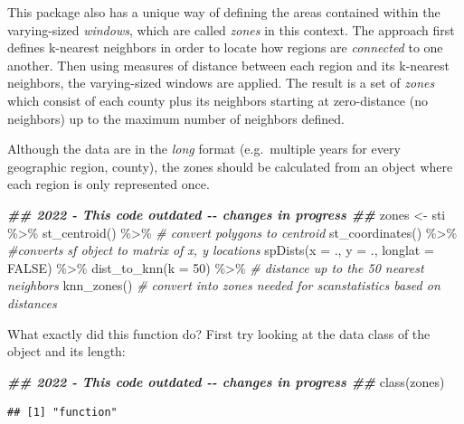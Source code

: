 \documentclass[
]{book}
\newenvironment{Shaded}{\begin{snugshade}}{\end{snugshade}}
\newcommand{\AttributeTok}[1]{\textcolor[rgb]{0.77,0.63,0.00}{#1}}
\newcommand{\CommentTok}[1]{\textcolor[rgb]{0.56,0.35,0.01}{\textit{#1}}}
\newcommand{\ConstantTok}[1]{\textcolor[rgb]{0.00,0.00,0.00}{#1}}
\newcommand{\DecValTok}[1]{\textcolor[rgb]{0.00,0.00,0.81}{#1}}
\newcommand{\DocumentationTok}[1]{\textcolor[rgb]{0.56,0.35,0.01}{\textbf{\textit{#1}}}}
\newcommand{\FunctionTok}[1]{\textcolor[rgb]{0.00,0.00,0.00}{#1}}
\newcommand{\NormalTok}[1]{#1}
\newcommand{\OtherTok}[1]{\textcolor[rgb]{0.56,0.35,0.01}{#1}}
\newcommand{\SpecialCharTok}[1]{\textcolor[rgb]{0.00,0.00,0.00}{#1}}
\begin{document}
This package also has a unique way of defining the areas contained within the varying-sized \emph{windows}, which are called \emph{zones} in this context. The approach first defines k-nearest neighbors in order to locate how regions are \emph{connected} to one another. Then using measures of distance between each region and its k-nearest neighbors, the varying-sized windows are applied. The result is a set of \emph{zones} which consist of each county plus its neighbors starting at zero-distance (no neighbors) up to the maximum number of neighbors defined.

Although the data are in the \emph{long} format (e.g.~multiple years for every geographic region, county), the zones should be calculated from an object where each region is only represented once.

\begin{Shaded}
\begin{Highlighting}[]
\DocumentationTok{\#\# 2022 {-} This code outdated {-}{-} changes in progress \#\#}
\NormalTok{zones }\OtherTok{\textless{}{-}}\NormalTok{ sti }\SpecialCharTok{\%\textgreater{}\%}
  \FunctionTok{st\_centroid}\NormalTok{() }\SpecialCharTok{\%\textgreater{}\%} \CommentTok{\# convert polygons to centroid}
  \FunctionTok{st\_coordinates}\NormalTok{() }\SpecialCharTok{\%\textgreater{}\%} \CommentTok{\#converts sf object to matrix of x, y locations}
  \FunctionTok{spDists}\NormalTok{(}\AttributeTok{x =}\NormalTok{ ., }\AttributeTok{y =}\NormalTok{ ., }\AttributeTok{longlat =} \ConstantTok{FALSE}\NormalTok{) }\SpecialCharTok{\%\textgreater{}\%}
  \FunctionTok{dist\_to\_knn}\NormalTok{(}\AttributeTok{k =} \DecValTok{50}\NormalTok{) }\SpecialCharTok{\%\textgreater{}\%} \CommentTok{\# distance up to the 50 nearest neighbors}
  \FunctionTok{knn\_zones}\NormalTok{() }\CommentTok{\# convert into zones needed for scanstatistics based on distances}
\end{Highlighting}
\end{Shaded}

What exactly did this function do? First try looking at the data class of the object and its length:

\begin{Shaded}
\begin{Highlighting}[]
\DocumentationTok{\#\# 2022 {-} This code outdated {-}{-} changes in progress \#\#}
\FunctionTok{class}\NormalTok{(zones)}
\end{Highlighting}
\end{Shaded}

\begin{verbatim}
## [1] "function"
\end{verbatim}
\end{document}
